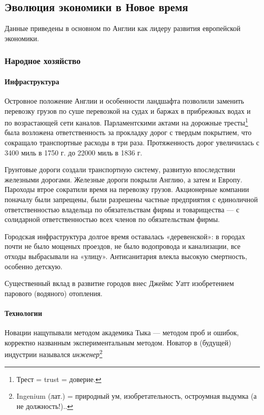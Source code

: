 %
%
\subsection[Эволюция экономики в Новое время]{Эволюция экономики в Новое время}
Данные приведены в основном по Англии как лидеру развития европейской экономики.

\subsubsection[Народное хозяйство]{Народное хозяйство}
\paragraph[Инфраструктура]{Инфраструктура}
Островное положение Англии и особенности ландшафта позволили заменить перевозку грузов по суше перевозкой на судах и
баржах в прибрежных водах и по возрастающей сети каналов. Парламентскими актами на дорожные
тресты\footnote{Трест = trust = доверие.} была возложена ответственность за прокладку дорог с твердым
покрытием, что сокращало транспортные расходы в три раза. Протяженность дорог увеличилась с 3400 миль в 1750 г. до
22000 миль в 1836 г.

Грунтовые дороги создали транспортную систему, развитую впоследствии железными дорогами. Железные дороги покрыли Англию,
а затем и Европу. Пароходы втрое сократили время на перевозку грузов.
Акционерные компании поначалу были запрещены, были разрешены частные предприятия с единоличной ответственностью
владельца по обязательствам фирмы и товарищества — с солидарной ответственностью всех членов по обязательствам фирмы.

Городская инфраструктура долгое время оставалась «деревенской»: в городах почти не было мощеных проездов, не было
водопровода и канализации, все отходы выбрасывали на «улицу». Антисанитария влекла высокую смертность, особенно
детскую.


Существенный вклад в развитие городов внес Джеймс Уатт изобретением парового (водяного) отопления.

\paragraph[Технологии]{Технологии}
Новации нащупывали методом академика Тыка — методом проб и ошибок, корректно названным экспериментальным методом.
Новатор в (будущей) индустрии назывался \textit{инженер}\footnote{\foreignlanguage{english}{Ingenium}
(лат.) = природный ум, изобретательность, остроумная выдумка (а не должность!)..}


